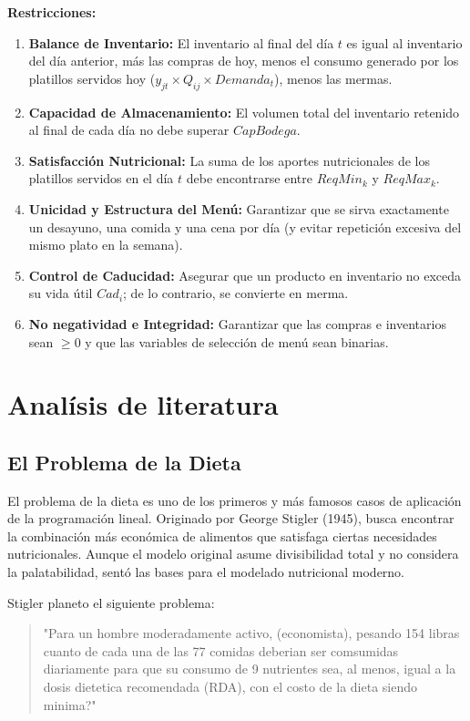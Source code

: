 \documentclass[12pt]{report}
\begin{document}
\noindent \textbf{Restricciones:}
\begin{enumerate}
    \item \textbf{Balance de Inventario:} El inventario al final del día $t$ es igual al inventario del día anterior, más las compras de hoy, menos el consumo generado por los platillos servidos hoy ($y_{jt} \times Q_{ij} \times Demanda_t$), menos las mermas.
    \item \textbf{Capacidad de Almacenamiento:} El volumen total del inventario retenido al final de cada día no debe superar $CapBodega$.
    \item \textbf{Satisfacción Nutricional:} La suma de los aportes nutricionales de los platillos servidos en el día $t$ debe encontrarse entre $ReqMin_k$ y $ReqMax_k$.
    \item \textbf{Unicidad y Estructura del Menú:} Garantizar que se sirva exactamente un desayuno, una comida y una cena por día (y evitar repetición excesiva del mismo plato en la semana).
    \item \textbf{Control de Caducidad:} Asegurar que un producto en inventario no exceda su vida útil $Cad_i$; de lo contrario, se convierte en merma.
    \item \textbf{No negatividad e Integridad:} Garantizar que las compras e inventarios sean $\ge 0$ y que las variables de selección de menú sean binarias.
\end{enumerate}

\section{Analísis de literatura}


\subsection{El Problema de la Dieta}
El problema de la dieta es uno de los primeros y más famosos casos de aplicación de la programación lineal. Originado por George Stigler (1945), busca encontrar la combinación más económica de alimentos que satisfaga ciertas necesidades nutricionales. Aunque el modelo original asume divisibilidad total y no considera la palatabilidad, sentó las bases para el modelado nutricional moderno.

Stigler planeto el siguiente problema:

\begin{quote}
  "Para un hombre moderadamente activo,  (economista), pesando 154 libras cuanto de cada una de las 77 comidas deberian ser comsumidas diariamente para que su consumo de 9 nutrientes sea, al menos, igual a la dosis dietetica recomendada (RDA), con el costo de la dieta siendo minima?"\autocite{dantzig1990}
\end{quote}
\end{document}

